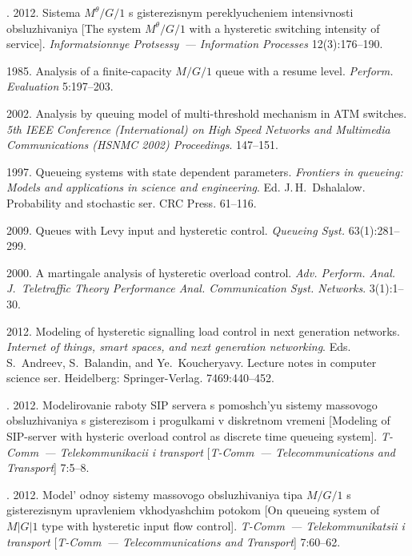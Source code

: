 \begin{multicols}{2}
{{\begin{thebibliography}{99}
. 2012.
Sistema $M^\theta/G/1$ s gisterezisnym pereklyucheniem inten\-siv\-nosti
obsluzhivaniya [The system $M^\theta/G/1$  with a hysteretic switching intensity of service].
\textit{Informatsionnye Protsessy~--- Information Processes} 12(3):176--190.

 1985. 
Analysis of a finite-capacity $M/G/1$ queue with a
resume level. \textit{Perform. Evaluation} 5:197--203.

 2002. 
Analysis by queuing model of multi-threshold
mechanism in ATM switches. \textit{5th IEEE  Conference (International) on High Speed
Networks and Multimedia Communications (HSNMC 2002) Proceedings}.
147--151.

 1997. 
Queueing systems with state dependent parameters.
\textit{Frontiers in queueing: Models and applications in
science and engineering}. Ed. J.\,H.~Dshalalow. Probability and stochastic ser.
CRC Press. 61--116.

 2009. 
Queues with Levy input and hysteretic control.
\textit{Queueing Syst.} 63(1):281--299.

 2000.
A martingale analysis of hysteretic overload
control. \textit{Adv. Perform. Anal. J.~Teletraffic Theory Performance Anal.
Communication Syst. Networks}. 3(1):1--30.

 2012.
Modeling of hysteretic signalling load control
in next generation networks. \textit{Internet of things, smart spaces, and
next generation networking}. Eds. S.~Andreev, S.~Balandin, and Ye.~Koucheryavy.
Lecture notes in computer science ser.
Heidelberg: Springer-Verlag. 7469:440--452.

. 2012. Modelirovanie
raboty SIP servera s pomoshch'yu sistemy massovogo
obsluzhivaniya s gisterezisom i progulkami
v diskretnom vremeni 
[Modeling of SIP-server with hysteric overload control as discrete time queueing system].
\textit{T-Comm~--- Telekommunikacii i transport} 
[\textit{T-Comm~--- Telecommunications and Transport}] 7:5--8.

.
2012. Mo\-del' odnoy sistemy massovogo obsluzhivaniya
tipa $M/G/1$ s gisterezisnym upravleniem vkhodyashchim potokom 
[On queueing system of $M|G|1$ type with hysteretic input flow control].
\textit{T-Comm~--- Telekommunikatsii i transport} 
[\textit{T-Comm~--- Telecommunications and Transport}] 7:60--62.


\end{thebibliography}}}
\end{multicols}
